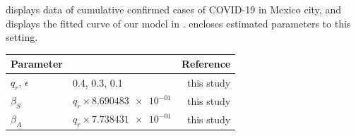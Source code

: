  displays data of cumulative confirmed cases
of COVID-19 in Mexico city, and  displays the fitted curve
of our model in .
 encloses estimated parameters to this
setting.

  \begin{table}
    \centering
    \begin{tabular}{@{}llr@{}}
    \toprule
        Parameter
        &   \centering{Median}
        &   Reference
        \\
        \midrule
          $q_r$, $\epsilon$
            &
              \num{.4}, \num{.3}, \num{.1}
            &
              this study
        \\
            $\beta_S$
            & $q_r \times \num{8.690483e-01} $
            & this study
        \\
            $\beta_A$
            & $q_r \times \num{7.738431e-01}$
            & this study


\end{tabular}
\end{table}
